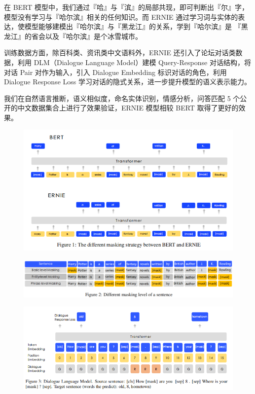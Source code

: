 \documentclass[a4paper,UTF8]{article}
\numberwithin{equation}{section}
\begin{document}
在 BERT 模型中，我们通过『哈』与『滨』的局部共现，即可判断出『尔』字，模型没有学习与『哈尔滨』相关的任何知识。而 ERNIE 通过学习词与实体的表达，使模型能够建模出『哈尔滨』与『黑龙江』的关系，学到『哈尔滨』是 『黑龙江』的省会以及『哈尔滨』是个冰雪城市。

训练数据方面，除百科类、资讯类中文语料外，ERNIE 还引入了论坛对话类数据，利用 DLM（Dialogue Language Model）建模 Query-Response 对话结构，将对话 Pair 对作为输入，引入 Dialogue Embedding 标识对话的角色，利用 Dialogue Response Loss 学习对话的隐式关系，进一步提升模型的语义表示能力。

我们在自然语言推断，语义相似度，命名实体识别，情感分析，问答匹配 5 个公开的中文数据集合上进行了效果验证，ERNIE 模型相较 BERT 取得了更好的效果。
\begin{figure}[H]
	\centering
	\includegraphics[width=\textwidth]{2-1.png}
\end{figure}
\begin{figure}[H]
	\centering
	\includegraphics[width=\textwidth]{2-2.png}
\end{figure}
\begin{figure}[H]
	\centering
	\includegraphics[width=\textwidth]{2-3.png}
\end{figure}
\end{document}
